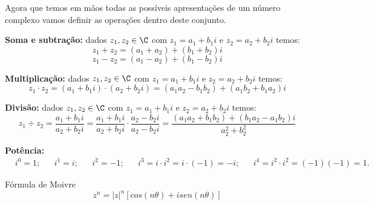  Agora que temos em mãos todas as possíveis apresentações de um número complexo vamos definir as operações dentro deste conjunto.
 
 \textbf{Soma e subtração:} dados $z_1, z_2 \in \C$ com $z_1= a_1 + b_1i$ e $z_2= a_2 + b_2i$ temos:
 \[z_1 + z_2= (a_1 + a_2) + (b_1 + b_2)i \]
 \[z_1 - z_2= (a_1 - a_2) + (b_1 - b_2)i \]
 
 \textbf{Multiplicação:} dados $z_1, z_2 \in \C$ com $z_1= a_1 + b_1i$ e $z_2= a_2 + b_2i$ temos:
 \[z_1 \cdot z_2= (a_1 + b_1i) \cdot (a_2 + b_2i)= (a_1a_2 - b_1b_2) + (a_1b_2 + b_1a_2)i \]
 
 \textbf{Divisão:} dados $z_1, z_2 \in \C$ com $z_1= a_1 + b_1i$ e $z_2= a_2 + b_2i$ temos:
 \[z_1 \div z_2= \frac{a_1 + b_1i}{a_2 + b_2i}= \frac{a_1 + b_1i}{a_2 + b_2i} \cdot \frac{a_2 - b_2i}{a_2 - b_2i} = \frac{(a_1a_2 + b_1b_2) + (b_1a_2 - a_1b_2)i}{a_2^2 + b_2^2} \]
 
 \textbf{Potência:}
 \begin{align*}
 & i^0= 1 ;& & i^1= i; & & i^2= -1; & & i^3= i \cdot i^2= i \cdot (-1)= -i; & & i^4= i^2 \cdot i^2= (-1)(-1)= 1 .&
 \end{align*}
 
 Fórmula de Moivre
 \begin{equation}
  z^n= |z|^n[cos(n \theta) + i sen(n \theta)]
 \end{equation}
 
 \newpage
 
 
